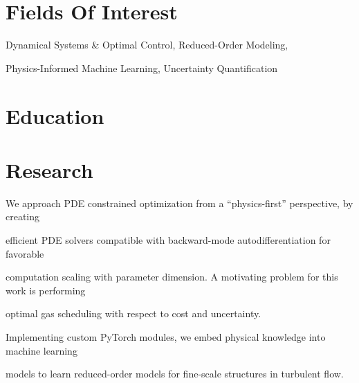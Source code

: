 \documentclass[11pt,a4paper,sans]{moderncv}
\begin{document}
\makecvtitle
\vspace*{-15mm}
\section{Fields Of Interest}
\hspace{1in}Dynamical Systems \& Optimal Control, Reduced-Order Modeling,

\hspace{1in}Physics-Informed Machine Learning, Uncertainty Quantification

\section{Education}

\section{Research}


\hspace{1in}We approach PDE constrained optimization from a ``physics-first'' perspective, by creating

\hspace{1in}efficient PDE solvers compatible with backward-mode autodifferentiation for favorable

\hspace{1in}computation scaling with parameter dimension. A motivating problem for this work is performing

\hspace{1in}optimal gas scheduling with respect to cost and uncertainty.


\hspace{1in}Implementing custom PyTorch modules, we embed physical knowledge into machine learning

\hspace{1in}models to learn reduced-order models for fine-scale structures in turbulent flow.
\end{document}
